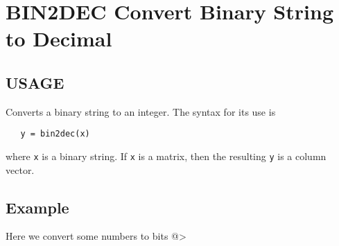 \section{BIN2DEC Convert Binary String to Decimal}

\subsection{USAGE}

Converts a binary string to an integer.  The syntax for its
use is
\begin{verbatim}
   y = bin2dec(x)
\end{verbatim}
where \verb|x| is a binary string. If \verb|x| is a matrix, then the resulting 
\verb|y| is a column vector.
\subsection{Example}

Here we convert some numbers to bits
@>
